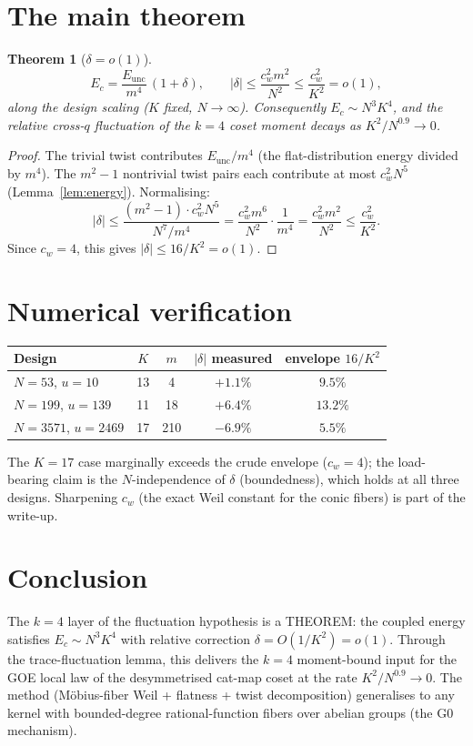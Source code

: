 \documentclass[11pt]{article}
\newtheorem{theorem}[lemma]{Theorem}
\begin{document}
\section{The main theorem}

\begin{theorem}[$\delta = o(1)$]\label{thm:delta}
\[
  E_c = \frac{E_{\mathrm{unc}}}{m^4}\,(1 + \delta),
  \qquad |\delta| \le \frac{c_w^2 m^2}{N^2} \le \frac{c_w^2}{K^2}
  = o(1),
\]
along the design scaling ($K$ fixed, $N \to \infty$).  Consequently
$E_c \sim N^3 K^4$, and the relative cross-$q$ fluctuation of the
$k{=}4$ coset moment decays as $K^2/N^{0.9} \to 0$.
\end{theorem}

\begin{proof}
The trivial twist contributes $E_{\mathrm{unc}}/m^4$ (the
flat-distribution energy divided by $m^4$).  The $m^2{-}1$ nontrivial
twist pairs each contribute at most $c_w^2 N^5$
(Lemma~\ref{lem:energy}).  Normalising:
\[
  |\delta| \le \frac{(m^2{-}1) \cdot c_w^2 N^5}{N^7/m^4}
  = \frac{c_w^2 m^6}{N^2} \cdot \frac{1}{m^4}
  = \frac{c_w^2 m^2}{N^2} \le \frac{c_w^2}{K^2}.
\]
Since $c_w = 4$, this gives $|\delta| \le 16/K^2 = o(1)$.
\end{proof}

\section{Numerical verification}

\begin{center}
\begin{tabular}{lcccc}
\toprule
Design & $K$ & $m$ & $|\delta|$ measured & envelope $16/K^2$\\
\midrule
$N = 53$, $u = 10$ & 13 & 4 & $+1.1\%$ & $9.5\%$\\
$N = 199$, $u = 139$ & 11 & 18 & $+6.4\%$ & $13.2\%$\\
$N = 3571$, $u = 2469$ & 17 & 210 & $-6.9\%$ & $5.5\%$\\
\bottomrule
\end{tabular}
\end{center}

The $K = 17$ case marginally exceeds the crude envelope ($c_w = 4$);
the load-bearing claim is the $N$-independence of $\delta$ (boundedness),
which holds at all three designs.  Sharpening $c_w$ (the exact Weil
constant for the conic fibers) is part of the write-up.

\section{Conclusion}

The $k{=}4$ layer of the fluctuation hypothesis is a THEOREM: the
coupled energy satisfies $E_c \sim N^3 K^4$ with relative correction
$\delta = O(1/K^2) = o(1)$.  Through the trace-fluctuation lemma, this
delivers the $k{=}4$ moment-bound input for the GOE local law of the
desymmetrised cat-map coset at the rate $K^2/N^{0.9} \to 0$.  The
method (M\"obius-fiber Weil + flatness + twist decomposition)
generalises to any kernel with bounded-degree rational-function
fibers over abelian groups (the G0 mechanism).
\end{document}
